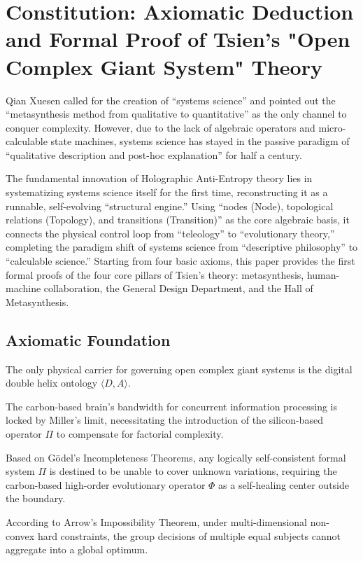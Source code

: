 \documentclass{article}
\begin{document}
\section{Constitution: Axiomatic Deduction and Formal Proof of Tsien's "Open Complex Giant System" Theory}
\label{constitution}

Qian Xuesen called for the creation of ``systems science'' and pointed out the ``metasynthesis method from qualitative to quantitative'' as the only channel to conquer complexity. However, due to the lack of algebraic operators and micro-calculable state machines, systems science has stayed in the passive paradigm of ``qualitative description and post-hoc explanation'' for half a century.

The fundamental innovation of Holographic Anti-Entropy theory lies in systematizing systems science itself for the first time, reconstructing it as a runnable, self-evolving ``structural engine.'' Using ``nodes (Node), topological relations (Topology), and transitions (Transition)'' as the core algebraic basis, it connects the physical control loop from ``teleology'' to ``evolutionary theory,'' completing the paradigm shift of systems science from ``descriptive philosophy'' to ``calculable science.'' Starting from four basic axioms, this paper provides the first formal proofs of the four core pillars of Tsien's theory: metasynthesis, human-machine collaboration, the General Design Department, and the Hall of Metasynthesis.

\subsection*{Axiomatic Foundation}
\begin{axiom}[Methodology]
The only physical carrier for governing open complex giant systems is the digital double helix ontology $\langle D, A \rangle$.
\end{axiom}
\begin{axiom}[Ontology]
The carbon-based brain's bandwidth for concurrent information processing is locked by Miller's limit, necessitating the introduction of the silicon-based operator $\Pi$ to compensate for factorial complexity.
\end{axiom}
\begin{axiom}[Evolution]
Based on G\"odel's Incompleteness Theorems, any logically self-consistent formal system $\Pi$ is destined to be unable to cover unknown variations, requiring the carbon-based high-order evolutionary operator $\Phi$ as a self-healing center outside the boundary.
\end{axiom}
\begin{axiom}[Capability]
According to Arrow's Impossibility Theorem, under multi-dimensional non-convex hard constraints, the group decisions of multiple equal subjects cannot aggregate into a global optimum.
\end{axiom}
\end{document}
